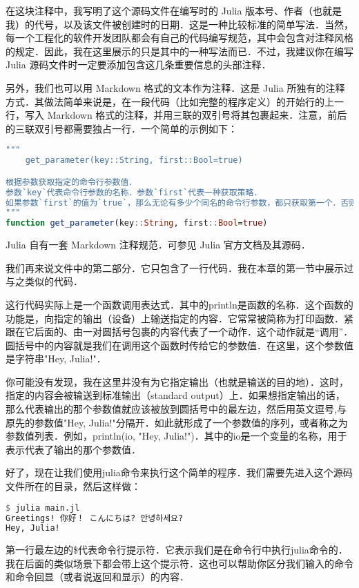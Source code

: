 在这块注释中，我写明了这个源码文件在编写时的 Julia 版本号、作者（也就是我）的代号，以及该文件被创建时的日期．这是一种比较标准的简单写法．当然，每一个工程化的软件开发团队都会有自己的代码编写规范，其中会包含对注释风格的规定．因此，我在这里展示的只是其中的一种写法而已．不过，我建议你在编写 Julia 源码文件时一定要添加包含这几条重要信息的头部注释．

另外，我们也可以用 Markdown 格式的文本作为注释．这是 Julia 所独有的注释方式．其做法简单来说是，在一段代码（比如完整的程序定义）的开始行的上一行，写入 Markdown 格式的注释，并用三联的双引号将其包裹起来．注意，前后的三联双引号都需要独占一行．一个简单的示例如下：

\begin{lstlisting}[language=julia]
"""
    get_parameter(key::String, first::Bool=true)

根据参数获取指定的命令行参数值．
参数`key`代表命令行参数的名称．参数`first`代表一种获取策略．
如果参数`first`的值为`true`，那么无论有多少个同名的命令行参数，都只获取第一个．否则只获取最后一个．
"""
function get_parameter(key::String, first::Bool=true)
\end{lstlisting}

Julia 自有一套 Markdown 注释规范．可参见 Julia 官方文档及其源码．

我们再来说文件中的第二部分．它只包含了一行代码．我在本章的第一节中展示过与之类似的代码．

这行代码实际上是一个函数调用表达式．其中的println是函数的名称．这个函数的功能是，向指定的输出（设备）上输送指定的内容．它常常被简称为打印函数．紧跟在它后面的、由一对圆括号包裹的内容代表了一个动作．这个动作就是“调用”．圆括号中的内容就是我们在调用这个函数时传给它的参数值．在这里，这个参数值是字符串"Hey, Julia!"．

你可能没有发现，我在这里并没有为它指定输出（也就是输送的目的地）．这时，指定的内容会被输送到标准输出（standard output）上．如果想指定输出的话，那么代表输出的那个参数值就应该被放到圆括号中的最左边，然后用英文逗号,与原先的参数值"Hey, Julia!"分隔开．如此就形成了一个参数值的序列，或者称之为参数值列表．例如，println(io, "Hey, Julia!")．其中的io是一个变量的名称，用于表示代表了输出的那个参数值．

好了，现在让我们使用julia命令来执行这个简单的程序．我们需要先进入这个源码文件所在的目录，然后这样做：
\begin{lstlisting}[language=julia]
$ julia main.jl 
Greetings! 你好！ こんにちは? 안녕하세요?
Hey, Julia!
\end{lstlisting}

第一行最左边的\$代表命令行提示符．它表示我们是在命令行中执行julia命令的．我在后面的类似场景下都会带上这个提示符．这也可以帮助你区分我们输入的命令和命令回显（或者说返回和显示）的内容．

